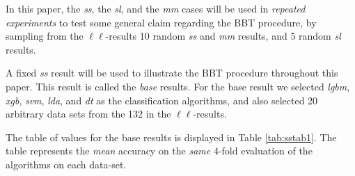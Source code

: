 \documentclass[twoside,11pt,preprint]{article}
\begin{document}
In this paper, the \emph{ss}, the \emph{sl}, and the \emph{mm} cases will be used in \emph{repeated experiments} to test some general claim regarding the BBT procedure, by sampling from the $\ell\ell$-results 10 random \emph{ss} and \emph{mm} results, and 5 random \emph{sl} results.

A fixed \emph{ss} result will be used to illustrate the BBT procedure
throughout this paper. This result is called the \emph{base} results. For the base result we
selected \emph{lgbm}, \emph{xgb}, \emph{svm}, \emph{lda}, and \emph{dt} as the classification
algorithms, and also selected 20 arbitrary data sets from the 132 in
the $\ell\ell$-results.

The table of values for the base results is displayed in Table \ref{tab:sstab1}.
The table represents the \emph{mean} accuracy on the \emph{same} 4-fold evaluation of the algorithms on each data-set.
\end{document}
